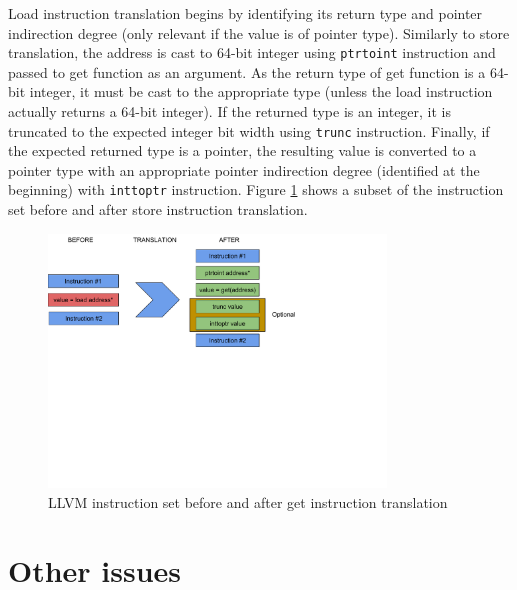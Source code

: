 \documentclass[bsc,frontabs,twoside,singlespacing,parskip,deptreport]{infthesis}     %
\begin{document}
Load instruction translation begins by identifying its return type and pointer indirection degree (only relevant if the value is of pointer type). Similarly to store translation, the address is cast to 64-bit integer using \texttt{ptrtoint} instruction and passed to get function as an argument. As the return type of get function is a 64-bit integer, it must be cast to the appropriate type (unless the load instruction actually returns a 64-bit integer). If the returned type is an integer, it is truncated to the expected integer bit width using \texttt{trunc} instruction. Finally, if the expected returned type is a pointer, the resulting value is converted to a pointer type with an appropriate pointer indirection degree (identified at the beginning) with \texttt{inttoptr} instruction. Figure \ref{fig:load_translation} shows a subset of the instruction set before and after store instruction translation.

\begin{figure}[H]
\centering
\includegraphics[width=0.8\textwidth]{images/load_translation}
\caption{LLVM instruction set before and after get instruction translation}
\label{fig:load_translation}
\end{figure}

\section{Other issues}
\label{section:other_issues}
\end{document}
